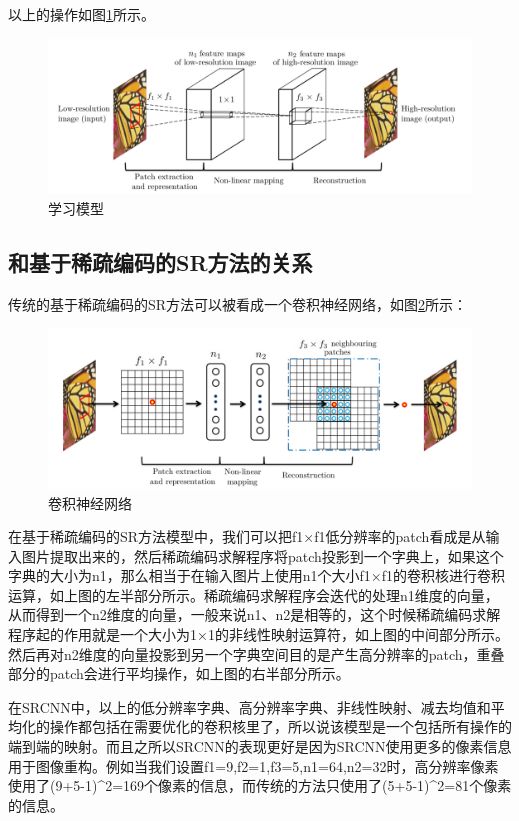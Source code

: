 \documentclass[UTF8,a4paper,10pt]{ctexrep}
\begin{document}
以上的操作如图\ref{fig:p2}所示。

\begin{figure}[H]
  \centering
  \includegraphics[scale=0.8]{figure/p2.png}
  \caption{学习模型}
  \label{fig:p2}
\end{figure}

\subsection{和基于稀疏编码的SR方法的关系}
传统的基于稀疏编码的SR方法可以被看成一个卷积神经网络，如图\ref{fig:p3}所示：
\begin{figure}[H]
  \centering
  \includegraphics[scale=0.8]{figure/p3.png}
  \caption{卷积神经网络}
  \label{fig:p3}
\end{figure}
在基于稀疏编码的SR方法模型中，我们可以把f1×f1低分辨率的patch看成是从输入图片提取出来的，然后稀疏编码求解程序将patch投影到一个字典上，如果这个字典的大小为n1，那么相当于在输入图片上使用n1个大小f1×f1的卷积核进行卷积运算，如上图的左半部分所示。稀疏编码求解程序会迭代的处理n1维度的向量，从而得到一个n2维度的向量，一般来说n1、n2是相等的，这个时候稀疏编码求解程序起的作用就是一个大小为1×1的非线性映射运算符，如上图的中间部分所示。然后再对n2维度的向量投影到另一个字典空间目的是产生高分辨率的patch，重叠部分的patch会进行平均操作，如上图的右半部分所示。

在SRCNN中，以上的低分辨率字典、高分辨率字典、非线性映射、减去均值和平均化的操作都包括在需要优化的卷积核里了，所以说该模型是一个包括所有操作的端到端的映射。而且之所以SRCNN的表现更好是因为SRCNN使用更多的像素信息用于图像重构。例如当我们设置f1=9,f2=1,f3=5,n1=64,n2=32时，高分辨率像素使用了(9+5-1)\^{}2=169个像素的信息，而传统的方法只使用了(5+5-1)\^{}2=81个像素的信息。
\end{document}
